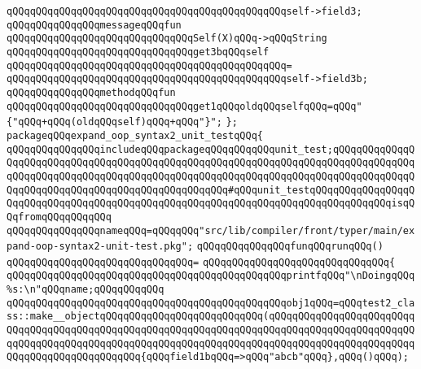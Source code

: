 \verb|qQQqqQQqqQQqqQQqqQQqqQQqqQQqqQQqqQQqqQQqqQQqqQQqself->field3;|\newline
\newline
\verb|qQQqqQQqqQQqqQQqmessageqQQqfun|\newline
\verb|qQQqqQQqqQQqqQQqqQQqqQQqqQQqqQQqSelf(X)qQQq->qQQqString|\newline
\verb|qQQqqQQqqQQqqQQqqQQqqQQqqQQqqQQqget3bqQQqself|\newline
\verb|qQQqqQQqqQQqqQQqqQQqqQQqqQQqqQQqqQQqqQQqqQQqqQQq=|\newline
\verb|qQQqqQQqqQQqqQQqqQQqqQQqqQQqqQQqqQQqqQQqqQQqqQQqself->field3b;|\newline
\newline
\verb|qQQqqQQqqQQqqQQqmethodqQQqfun|\newline
\verb|qQQqqQQqqQQqqQQqqQQqqQQqqQQqqQQqget1qQQqoldqQQqselfqQQq=qQQq"{"qQQq+qQQq(oldqQQqself)qQQq+qQQq"}";|\newline
\verb|};|\newline
\newline
\verb|packageqQQqexpand_oop_syntax2_unit_testqQQq{|\newline
\newline
\verb|qQQqqQQqqQQqqQQqincludeqQQqpackageqQQqqQQqqQQqunit_test;qQQqqQQqqQQqqQQqqQQqqQQqqQQqqQQqqQQqqQQqqQQqqQQqqQQqqQQqqQQqqQQqqQQqqQQqqQQqqQQqqQQqqQQqqQQqqQQqqQQqqQQqqQQqqQQqqQQqqQQqqQQqqQQqqQQqqQQqqQQqqQQqqQQqqQQqqQQqqQQqqQQqqQQqqQQqqQQqqQQqqQQqqQQqqQQq#qQQqunit_testqQQqqQQqqQQqqQQqqQQqqQQqqQQqqQQqqQQqqQQqqQQqqQQqqQQqqQQqqQQqqQQqqQQqqQQqqQQqqQQqqQQqisqQQqfromqQQqqQQqqQQq|\newline
\newline
\verb|qQQqqQQqqQQqqQQqnameqQQq=qQQqqQQq"src/lib/compiler/front/typer/main/expand-oop-syntax2-unit-test.pkg";|\newline
\newline
\verb|qQQqqQQqqQQqqQQqfunqQQqrunqQQq()|\newline
\verb|qQQqqQQqqQQqqQQqqQQqqQQqqQQqqQQq=|\newline
\verb|qQQqqQQqqQQqqQQqqQQqqQQqqQQqqQQq{|\newline
\verb|qQQqqQQqqQQqqQQqqQQqqQQqqQQqqQQqqQQqqQQqqQQqqQQqprintfqQQq"\nDoingqQQq%s:\n"qQQqname;qQQqqQQqqQQq|\newline
\newline
\verb|qQQqqQQqqQQqqQQqqQQqqQQqqQQqqQQqqQQqqQQqqQQqqQQqobj1qQQq=qQQqtest2_class::make__objectqQQqqQQqqQQqqQQqqQQqqQQqqQQq(qQQqqQQqqQQqqQQqqQQqqQQqqQQqqQQqqQQqqQQqqQQqqQQqqQQqqQQqqQQqqQQqqQQqqQQqqQQqqQQqqQQqqQQqqQQqqQQqqQQqqQQqqQQqqQQqqQQqqQQqqQQqqQQqqQQqqQQqqQQqqQQqqQQqqQQqqQQqqQQqqQQqqQQqqQQqqQQqqQQqqQQqqQQq{qQQqfield1bqQQq=>qQQq"abcb"qQQq},qQQq()qQQq);|\newline
